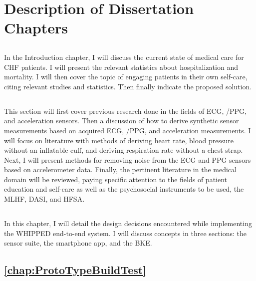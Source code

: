\section{Description of Dissertation Chapters}

\subsection{ }
\label{subsec:Chapter1Introduction}
In the Introduction chapter, I will discuss the current state of medical care for CHF patients. I will present the relevant statistics about hospitalization and mortality. I will then cover the topic of engaging patients in their own self-care, citing relevant studies and statistics. Then finally indicate the proposed solution.

\subsection{ }
\label{subsec:Chapter2LitReview}
This section will first cover previous research done in the fields of ECG,  /PPG, and acceleration sensors. Then a discussion of how to derive synthetic sensor measurements based on acquired ECG,  /PPG, and acceleration measurements. I will focus on literature with methods of deriving heart rate, blood pressure without an inflatable cuff, and deriving respiration rate without a chest strap. Next, I will present methods for removing noise from the ECG and PPG sensors based on accelerometer data. Finally, the pertinent literature in the medical domain will be reviewed, paying specific attention to the fields of patient education and self-care as well as the psychosocial instruments to be used, the MLHF, DASI, and HFSA.

\subsection{ }
\label{subsec:Chapter3SystemDesignConcepts}
In this chapter, I will detail the design decisions encountered while implementing the WHIPPED end-to-end system. I will discuss concepts in three sections: the sensor suite, the smartphone app, and the BKE.

\subsection{\cref{chap:ProtoTypeBuildTest} }

